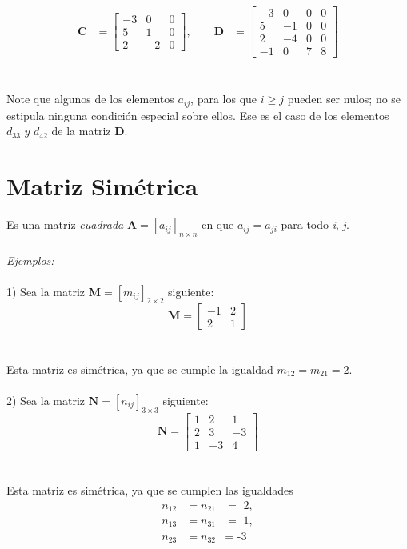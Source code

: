 \documentclass[a4paper,12pt]{report} %
\begin{document}
\[
\begin{aligned}
\mathbf{C} &= \begin{bmatrix}
    -3 & 0 & 0 \\
    5 & 1 & 0 \\
    2 & -2 & 0
\end{bmatrix},
\qquad
\mathbf{D} &= \begin{bmatrix}
    -3 & 0 & 0 & 0\\
    5 & -1 & 0 & 0\\
    2 & -4 & 0 & 0\\
    -1 & 0 & 7 & 8
\end{bmatrix}
\end{aligned}
\]\\ \\
Note que algunos de los elementos \(\mathit{a_{ij}}\), para los que \(\mathit{i\geq j}\) pueden ser nulos; no se estipula ninguna condición especial sobre ellos. Ese es el caso de los elementos \(\mathit{d_{33}\text{ y }d_{42}}\) de la matriz \textbf{D}.
\\
\section{Matriz Simétrica}
Es una matriz \textit{cuadrada} \(\mathbf{A} = \left[\mathit{a_{ij}}\right]_\mathit{n\times n}\) en que \(\mathit{a_{ij}} = \mathit{a_{ji}}\) para todo \textit{i}, \textit{j}.
\\ \\
\textit{Ejemplos:} \\ \\
1) Sea la matriz \(\mathbf{M} = \left[\mathit{m_{ij}}\right]_\mathit{2\times 2}\) siguiente:
\[
\mathbf{M} = \begin{bmatrix}
    -1 & 2\\
    2 & 1
\end{bmatrix}
\]\\ \\
Esta matriz es simétrica, ya que se cumple la igualdad \(\mathit{m_{12}} = \mathit{m_{21}} = 2\). \\ \\
2) Sea la matriz \(\mathbf{N} = \left[\mathit{n_{ij}}\right]_\mathit{3\times 3}\) siguiente:
\[
\mathbf{N} = \begin{bmatrix}
    1 & 2 & 1\\
    2 & 3 & -3\\
    1 & -3 & 4
\end{bmatrix}
\]\\ \\
Esta matriz es simétrica, ya que se cumplen las igualdades
\[
\begin{matrix}
\mathit{n_{12}} &= \mathit{n_{21}} &= \text{ 2}, \\
\mathit{n_{13}} & = \mathit{n_{31}} &= \text{ 1}, \\
\mathit{n_{23}} & = \mathit{n_{32}} &= \text{ -3}
\end{matrix}
\]
\\
\end{document}
